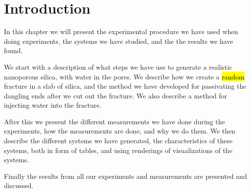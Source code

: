 \chapter{Introduction}
In this chapter we will present the experimental procedure we have used when doing experiments, the systems we have studied, and the the results we have found. 

We start with a description of what steps we have use to generate a realistic nanoporous silica, with water in the pores. We describe how we create a \hl{random} fracture in a slab of silica, and the method we have developed for passivating the dangling ends after we cut out the fracture. We also describe a method for injecting water into the fracture.

After this we present the different measurements we have done during the experiments, how the measurements are done, and why we do them. We then describe the different systems we have generated, the characteristics of these systems, both in form of tables, and using renderings of visualizations of the systems.

Finally the results from all our experiments and measurements are presented and discussed. 